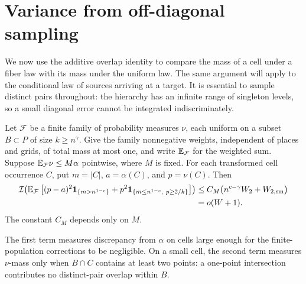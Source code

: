 \section{Variance from off-diagonal sampling}\label{sec:variance}

We now use the additive overlap identity to compare the mass of a cell
under a fiber law with its mass under the uniform law.  The same argument
will apply to the conditional law of sources arriving at a target.  It
is essential to sample distinct pairs throughout: the hierarchy has an
infinite range of singleton levels, so a small diagonal error cannot be
integrated indiscriminately.

\begin{lemma}\label{lem:variance}
Let $\mathcal F$ be a finite family of probability measures $\nu$, each
uniform on a subset $B\subset P$ of size $k\ge n^\gamma$.  Give the family
nonnegative weights, independent of places and grids, of total mass at
most one, and write $\mathbb E_{\mathcal F}$ for the weighted sum.  Suppose
$\mathbb E_{\mathcal F}\nu\le M\alpha$ pointwise, where $M$ is fixed.
For each transformed cell occurrence $C$, put
$m=|C|$, $a=\alpha(C)$, and $p=\nu(C)$.  Then
\begin{align}
\mathcal I\!\left(\mathbb E_{\mathcal F}\left[
  (p-a)^2\mathbf 1_{\{m>n^{1-c}\}}
  +p^2\mathbf 1_{\{m\le n^{1-c},\ p\ge2/k\}}
\right]\right)
&\le C_M\bigl(n^{c-\gamma}W_2+W_{2,\mathrm{sm}}\bigr)
\label{eq:variance-quant}\\
&=o(W+1).
\label{eq:variance}
\end{align}
The constant $C_M$ depends only on $M$.
\end{lemma}

The first term measures discrepancy from $\alpha$ on cells large enough
for the finite-population corrections to be negligible.  On a small
cell, the second term measures $\nu$-mass only when $B\cap C$ contains
at least two points: a one-point intersection contributes no
distinct-pair overlap within $B$.


